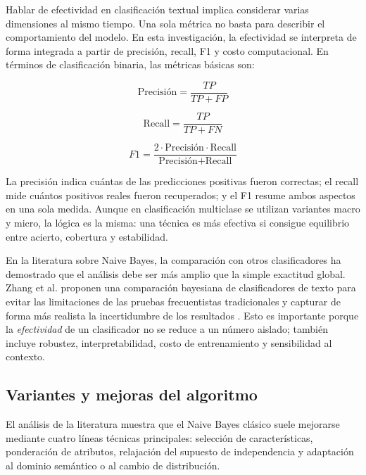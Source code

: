 Hablar de efectividad en clasificación textual implica considerar varias dimensiones al mismo tiempo. Una sola métrica no basta para describir el comportamiento del modelo. En esta investigación, la efectividad se interpreta de forma integrada a partir de precisión, recall, F1 y costo computacional. En términos de clasificación binaria, las métricas básicas son:

\begin{equation}
\text{Precisión} = \frac{TP}{TP+FP}
\label{eq:precision}
\end{equation}

\begin{equation}
\text{Recall} = \frac{TP}{TP+FN}
\label{eq:recall}
\end{equation}

\begin{equation}
F1 = \frac{2 \cdot \text{Precisión} \cdot \text{Recall}}{\text{Precisión} + \text{Recall}}
\label{eq:f1}
\end{equation}

La precisión indica cuántas de las predicciones positivas fueron correctas; el recall mide cuántos positivos reales fueron recuperados; y el F1 resume ambos aspectos en una sola medida. Aunque en clasificación multiclase se utilizan variantes macro y micro, la lógica es la misma: una técnica es más efectiva si consigue equilibrio entre acierto, cobertura y estabilidad.

En la literatura sobre Naive Bayes, la comparación con otros clasificadores ha demostrado que el análisis debe ser más amplio que la simple exactitud global. Zhang et al. proponen una comparación bayesiana de clasificadores de texto para evitar las limitaciones de las pruebas frecuentistas tradicionales y capturar de forma más realista la incertidumbre de los resultados \cite{10.1145/2911451.2911547}. Esto es importante porque la \textit{efectividad} de un clasificador no se reduce a un número aislado; también incluye robustez, interpretabilidad, costo de entrenamiento y sensibilidad al contexto.

\subsection{Variantes y mejoras del algoritmo}

El análisis de la literatura muestra que el Naive Bayes clásico suele mejorarse mediante cuatro líneas técnicas principales: selección de características, ponderación de atributos, relajación del supuesto de independencia y adaptación al dominio semántico o al cambio de distribución.

